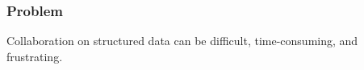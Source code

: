 \begin{frame}[fragile]
  \frametitle{Problem}
  Collaboration on structured data can be difficult, time-consuming, and frustrating.
\end{frame}
